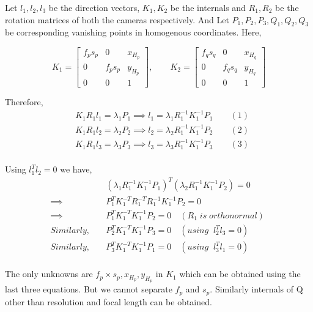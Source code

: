 \documentclass[a4paper]{article}
\begin{document}
Let $l_1,l_2,l_3$ be the direction vectors, $K_1, K_2$ be the  internals and $ R_1, R_2$ be the rotation matrices of both the cameras respectively. And Let $ P_1, P_2,P_3,Q_1,Q_2,Q_3$ be corresponding vanishing points in homogenous coordinates. Here, 

\[
K_1 =
\begin{bmatrix}
    f_ps_p & 0 & x_{H_p}  \\
    0 & f_ps_p & y_{H_p}  \\
    0 & 0 & 1
    \end{bmatrix}, \qquad
K_2 =
\begin{bmatrix}
    f_qs_q & 0 & x_{H_q}  \\
    0 & f_qs_q & y_{H_q}  \\
    0 & 0 & 1
    \end{bmatrix}
\]

Therefore, 
\begin{equation*}
\begin{split}
& K_1R_1l_1 = \lambda_1 P_1 \implies l_1 = \lambda_1R_1^{-1}K_1^{-1}P_1 \qquad (1)\\
& K_1R_1l_2 = \lambda_2P_2 \implies l_2 = \lambda_2R_1^{-1}K_1^{-1}P_2 \qquad (2)\\
& K_1R_1l_3 = \lambda_3P_3 \implies l_3 = \lambda_3R_1^{-1}K_1^{-1}P_3 \qquad (3)\\
\end{split}
\end{equation*}

\newpage
Using $l_1^Tl_2^{}=0$ we have,
\begin{equation*}
\begin{split}
& (\lambda_1R_1^{-1}K_1^{-1}P_1)^T(\lambda_2R_1^{-1}K_1^{-1}P_2) = 0 \qquad \\
\implies & P_1^{T}K_1^{-T}R_1^{-T}R_1^{-1}K_1^{-1}P_2 = 0\\
\implies & P_1^{T}K_1^{-T}K_1^{-1}P_2 = 0 \quad (R_1\;is \;orthonormal) \\
Similarly, \quad &  P_2^{T}K_1^{-T}K_1^{-1}P_3 = 0 \quad (using\;\; l_2^Tl_3^{}=0)\\
Similarly, \quad &  P_3^{T}K_1^{-T}K_1^{-1}P_1 = 0 \quad (using\;\; l_3^Tl_1^{}=0)\\
\end{split}
\end{equation*}

The only unknowns are $f_p\times s_p,x_{H_p},y_{H_p}$ in $K_1$ which can be obtained using the last three equations. But we cannot separate $f_p$ and $s_p$. Similarly internals of Q other than resolution and focal length can be obtained. 
\end{document}
